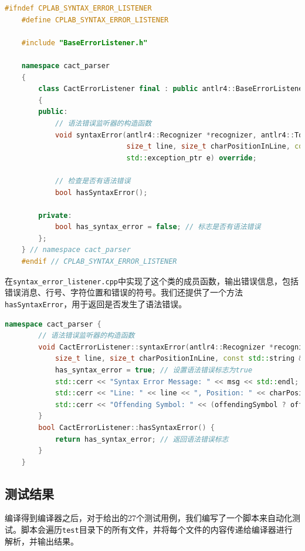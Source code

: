 \documentclass[UTF8]{report}
\begin{document}
\begin{lstlisting}[language=C++]
    #ifndef CPLAB_SYNTAX_ERROR_LISTENER
    #define CPLAB_SYNTAX_ERROR_LISTENER
    
    #include "BaseErrorListener.h"
    
    namespace cact_parser
    {
        class CactErrorListener final : public antlr4::BaseErrorListener
        {
        public:
            // 语法错误监听器的构造函数
            void syntaxError(antlr4::Recognizer *recognizer, antlr4::Token *offendingSymbol,
                             size_t line, size_t charPositionInLine, const std::string &msg,
                             std::exception_ptr e) override;
    
            // 检查是否有语法错误
            bool hasSyntaxError();
    
        private:
            bool has_syntax_error = false; // 标志是否有语法错误
        };
    } // namespace cact_parser
    #endif // CPLAB_SYNTAX_ERROR_LISTENER
\end{lstlisting}

在\texttt{syntax\_error\_listener.cpp}中实现了这个类的成员函数，输出错误信息，包括错误消息、行号、字符位置和错误的符号。我们还提供了一个方法\texttt{hasSyntaxError}，用于返回是否发生了语法错误。

\begin{lstlisting}[language=C++]
    namespace cact_parser {
        // 语法错误监听器的构造函数
        void CactErrorListener::syntaxError(antlr4::Recognizer *recognizer, antlr4::Token *offendingSymbol,
            size_t line, size_t charPositionInLine, const std::string &msg, std::exception_ptr e) {
            has_syntax_error = true; // 设置语法错误标志为true
            std::cerr << "Syntax Error Message: " << msg << std::endl; // 输出语法错误信息
            std::cerr << "Line: " << line << ", Position: " << charPositionInLine << std::endl; // 输出错误位置
            std::cerr << "Offending Symbol: " << (offendingSymbol ? offendingSymbol->getText() : "null") << std::endl; // 输出错误的符号
        }
        bool CactErrorListener::hasSyntaxError() {
            return has_syntax_error; // 返回语法错误标志
        }
    }
\end{lstlisting}

\subsection{测试结果}

编译得到编译器之后，对于给出的27个测试用例，我们编写了一个脚本来自动化测试。脚本会遍历\texttt{test}目录下的所有文件，并将每个文件的内容传递给编译器进行解析，并输出结果。
\end{document}
